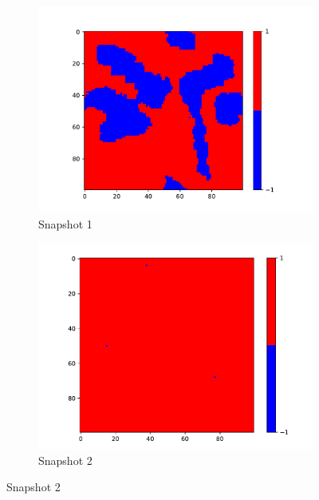 \begin{figure}
    \centering
    \begin{subfigure}{0.45\textwidth}
      \centering
      \includegraphics[width=\linewidth]{images/Ising1_0.pdf}
      \caption{Snapshot 1}
      \label{fig:image1}
    \end{subfigure}
    \hfill
    \begin{subfigure}{0.45\textwidth}
      \centering
      \includegraphics[width=\linewidth]{images/Ising1_2.pdf}
      \caption{Snapshot 2}
      \label{fig:image2}
    \end{subfigure}
    
    \vspace{0.5cm}
    

\end{figure}
